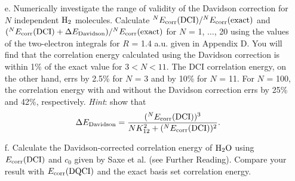 \documentclass[a4paper]{book}
\newcommand{\corr}{{\rm corr}}
\begin{document}
\begin{exercise}
\begin{enumerate}
	\item[e.] Numerically investigate the range of validity of the Davidson correction for $N$ independent $\ce{H2}$ molecules. Calculate ${}^N E_\corr( {\rm DCI} )/ {}^N E_\corr( {\rm exact} )$ and $({}^N E_\corr( {\rm DCI} ) + \Delta E_{\rm Davidson} )/ {}^N E_\corr( {\rm exact} )$ for $N$ = 1, $\ldots$, 20 using the values of the two-electron integrals for $R$ = 1.4 a.u. given in Appendix D. You will find that the correlation energy calculated using the Davidson correction is within 1\% of the exact value for $3<N<11$. The DCI correlation energy, on the other hand, errs by 2.5\% for $N$ = 3 and by 10\% for $N$ = 11. For $N$ = 100, the correlation energy with and without the Davidson correction errs by 25\% and 42\%, respectively. {\it Hint}: show that
	\[
		\Delta E_{\rm Davidson} = \frac{ ({}^N E_\corr( {\rm DCI} ))^3 }{ NK^2_{12} + ( {}^N E_\corr( {\rm DCI} ) )^2 }.
	\]
	
	\item[f.] Calculate the Davidson-corrected correlation energy of $\ce{H2O}$ using $E_\corr( {\rm DCI} )$ and $c_0$ given by Saxe et al. (see Further Reading). Compare your result with $E_\corr( {\rm DQCI} )$ and the exact basis set correlation energy.
	\end{enumerate}
	\end{exercise}
	
\end{document}
